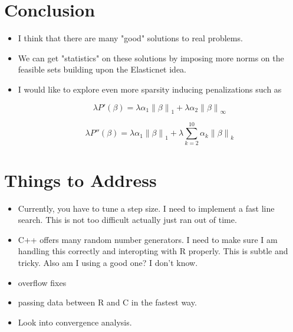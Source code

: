\documentclass[10pt, reqno]{article}
\numberwithin{equation}{section}
\newcommand{\norm}[1]{\left\lVert#1\right\rVert}
\begin{document}
\newpage
\section*{Conclusion}

\begin{itemize}
\item I think that there are many "good" solutions to real problems.

\item We can get "statistics" on these solutions by imposing more norms on the feasible sets building upon the Elasticnet \cite{elasticnet} idea.

\item I would like to explore even more sparsity inducing penalizations such as

\[
\lambda P'(\beta) = \lambda \alpha_1 \norm{\beta}_1 + \lambda \alpha_2 \norm{\beta}_\infty 
\]

\[
\lambda P''(\beta) = \lambda \alpha_1 \norm{\beta}_1 + \lambda \sum_{k = 2}^{10} \alpha_k \norm{\beta}_{k}
\]

\end{itemize}

\newpage
\section*{Things to Address}

\begin{itemize}

\item Currently, you have to tune a step size. I need to implement a fast line search. This is not too difficult actually just ran out of time.

\item C++ offers many random number generators. I need to make sure I am handling this correctly and interopting with R properly.
This is subtle and tricky.
Also am I using a good one? I don't know.

\item overflow fixes

\item passing data between R and C in the fastest way.

\item Look into convergence analysis.

\end{itemize}
\end{document}
